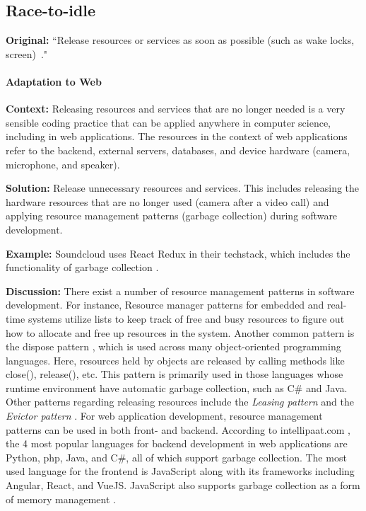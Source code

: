 

\subsection{Race-to-idle}\label{sec:patterns-RaceToIdle}
\textbf{Original:} ``Release resources or services as soon as possible (such as wake locks, screen)~\cite{cruz2019catalog}."

\paragraph{Adaptation to Web}\mbox{}

\textbf{Context:} Releasing resources and services that are no longer needed is a very sensible coding practice that can be applied anywhere in computer science, including in web applications. The resources in the context of web applications refer to the backend, external servers, databases, and device hardware (\eg camera, microphone, and speaker).

\textbf{Solution:} Release unnecessary resources and services. This includes releasing the hardware resources that are no longer used (\eg camera after a video call) and applying resource management patterns (\eg garbage collection) during software development.

\textbf{Example:} Soundcloud uses React Redux in their techstack, which includes the functionality of garbage collection \cite{redux-garbage-collection}.

\textbf{Discussion:} There exist a number of resource management patterns in software development. For instance, Resource manager patterns \cite{design-pattern-resource-manager} for embedded and real-time systems utilize lists to keep track of free and busy resources to figure out how to allocate and free up resources in the system. Another common pattern is the dispose pattern \cite{wikipedia_dispose_pattern}, which is used across many object-oriented programming languages. Here, resources held by objects are released by calling methods like close(), release(), etc. This pattern is primarily used in those languages whose runtime environment have automatic garbage collection, such as C\# and Java. Other patterns regarding releasing resources include the \emph{Leasing pattern} and the \emph{Evictor pattern} \cite{resource-manager-patterns}.
For web application development, resource management patterns can be used in both front- and backend. According to intellipaat.com \cite{best-web-dev-languages}, the 4 most popular languages for backend development in web applications are Python, php, Java, and C\#, all of which support garbage collection. The most used language for the frontend is JavaScript along with its frameworks including Angular, React, and VueJS. JavaScript also supports garbage collection as a form of memory management \cite{dev-mozilla-memory-management}.

